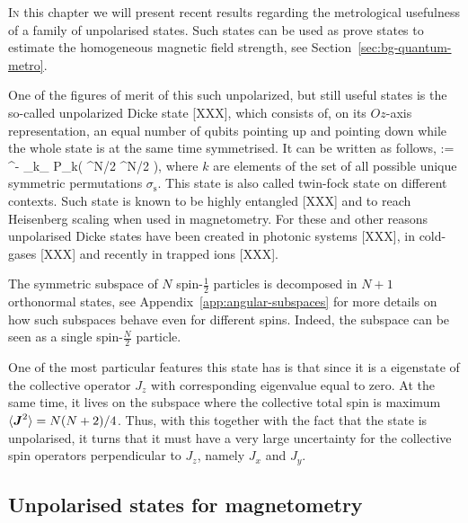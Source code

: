 \lettrine[lines=2, findent=3pt,nindent=0pt]{I}{n} this chapter we will present recent results regarding the metrological usefulness of a family of unpolarised states.
Such states can be used as prove states to estimate the homogeneous magnetic field strength, see Section~\ref{sec:bg-quantum-metro}.

One of the figures of merit of this such unpolarized, but still useful states is the so-called unpolarized Dicke state [XXX], which consists of, on its $Oz$-axis  representation, an equal number of qubits pointing up and pointing down while the whole state is at the same time symmetrised.
It can be written as follows,
\be
   \equiv {}:= ^{-}
  \sum_{k\in \sigma_}
  P_{k}\left( ^{\otimes N/2} ^{\otimes N/2}
  \right),
  \label{eq:vd-unpolarised-dicke}
\ee
where $k$ are elements of the set of all possible unique symmetric permutations $\sigma_\text{s}$.
This state is also called twin-fock state on different contexts.
Such state is known to be highly entangled [XXX] and to reach Heisenberg scaling when used in magnetometry.
For these and other reasons unpolarised Dicke states have been created in photonic systems [XXX], in cold-gases [XXX] and recently in trapped ions [XXX].

The symmetric subspace of $N$ spin-$\frac{1}{2}$ particles is decomposed in $N+1$ orthonormal states, see Appendix~\ref{app:angular-subspaces} for more details on how such subspaces behave even for different spins.
Indeed, the subspace can be seen as a single spin-$\frac{N}{2}$ particle.

One of the most particular features this state has is that since it is a eigenstate of the collective operator $J_z$ with corresponding eigenvalue equal to zero.
At the same time, it lives on the subspace where the collective total spin is maximum\ie $\langle \boldsymbol{J}^2 \rangle=N(N+2)/4$.
Thus, with this together with the fact that the state is unpolarised, it turns that it must have a very large uncertainty for the collective spin operators perpendicular to $J_z$, namely $J_x$ and $J_y$.

\subsection{Unpolarised states for magnetometry}

